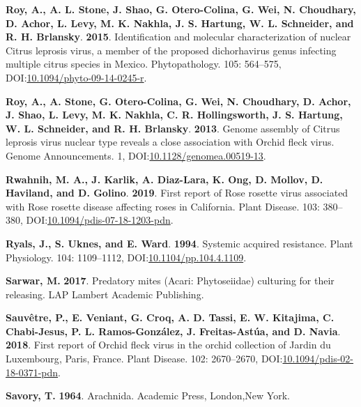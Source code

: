 \documentclass[12pt,final,CPage]{ufthesis}
\newlength{\cslhangindent}
\newenvironment{CSLReferences}[2] %
{%
	\setlength{\parindent}{0pt}
	\ifodd #1 \everypar{\setlength{\hangindent}{\cslhangindent}}\ignorespaces\fi
	\ifnum #2 > 0
	\setlength{\parskip}{#2\baselineskip}
	\fi
}%
{}
\begin{document}
{\begin{CSLReferences}{1}{0}
  \leavevmode{}%
  \textbf{Roy, A., A. L. Stone, J. Shao, G. Otero-Colina, G. Wei, N. Choudhary, D. Achor, L. Levy, M. K. Nakhla, J. S. Hartung, W. L. Schneider, and R. H. Brlansky}. \textbf{2015}. Identification and molecular characterization of nuclear {Citrus leprosis virus}, a member of the proposed dichorhavirus genus infecting multiple citrus species in {Mexico}. Phytopathology{\textregistered}. 105: 564--575, DOI:\href{https://doi.org/10.1094/phyto-09-14-0245-r}{10.1094/phyto-09-14-0245-r}.

  \leavevmode{}%
  \textbf{Roy, A., A. Stone, G. Otero-Colina, G. Wei, N. Choudhary, D. Achor, J. Shao, L. Levy, M. K. Nakhla, C. R. Hollingsworth, J. S. Hartung, W. L. Schneider, and R. H. Brlansky}. \textbf{2013}. Genome assembly of {Citrus leprosis virus} nuclear type reveals a close association with {Orchid fleck virus}. Genome Announcements. 1, DOI:\href{https://doi.org/10.1128/genomea.00519-13}{10.1128/genomea.00519-13}.

  \leavevmode{}%
  \textbf{Rwahnih, M. A., J. Karlik, A. Diaz-Lara, K. Ong, D. Mollov, D. Haviland, and D. Golino}. \textbf{2019}. First report of {Rose rosette virus} associated with {Rose rosette disease} affecting roses in {California}. Plant Disease. 103: 380--380, DOI:\href{https://doi.org/10.1094/pdis-07-18-1203-pdn}{10.1094/pdis-07-18-1203-pdn}.

  \leavevmode{}%
  \textbf{Ryals, J., S. Uknes, and E. Ward}. \textbf{1994}. Systemic acquired resistance. Plant Physiology. 104: 1109--1112, DOI:\href{https://doi.org/10.1104/pp.104.4.1109}{10.1104/pp.104.4.1109}.

  \leavevmode{}%
  \textbf{Sarwar, M.} \textbf{2017}. Predatory mites ({Acari}: {Phytoseiidae}) culturing for their releasing. LAP Lambert Academic Publishing.

  \leavevmode{}%
  \textbf{Sauvêtre, P., E. Veniant, G. Croq, A. D. Tassi, E. W. Kitajima, C. Chabi-Jesus, P. L. Ramos-González, J. Freitas-Astúa, and D. Navia}. \textbf{2018}. First report of {Orchid fleck virus} in the orchid collection of {Jardin du Luxembourg}, {Paris, France}. Plant Disease. 102: 2670--2670, DOI:\href{https://doi.org/10.1094/pdis-02-18-0371-pdn}{10.1094/pdis-02-18-0371-pdn}.

  \leavevmode{}%
  \textbf{Savory, T.} \textbf{1964}. Arachnida. Academic Press, London,New York.


\end{CSLReferences}}
\end{document}
